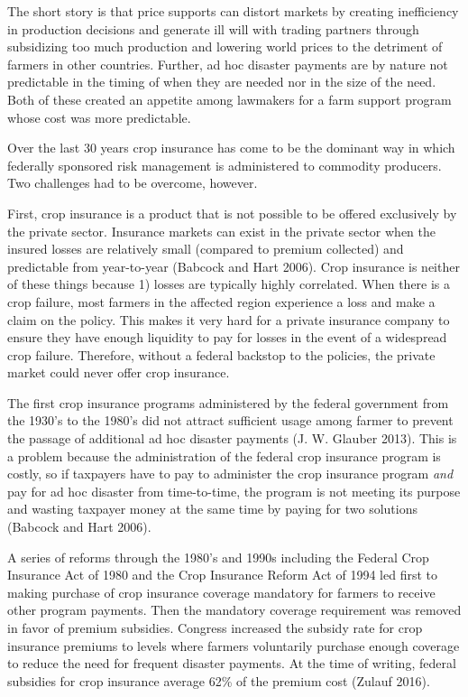 \documentclass[
  letterpaper,
  DIV=11,
  numbers=noendperiod]{scrreprt}
\begin{document}
The short story is that price supports can distort markets by creating
inefficiency in production decisions and generate ill will with trading
partners through subsidizing too much production and lowering world
prices to the detriment of farmers in other countries. Further, ad hoc
disaster payments are by nature not predictable in the timing of when
they are needed nor in the size of the need. Both of these created an
appetite among lawmakers for a farm support program whose cost was more
predictable.

Over the last 30 years crop insurance has come to be the dominant way in
which federally sponsored risk management is administered to commodity
producers. Two challenges had to be overcome, however.

First, crop insurance is a product that is not possible to be offered
exclusively by the private sector. Insurance markets can exist in the
private sector when the insured losses are relatively small (compared to
premium collected) and predictable from year-to-year (Babcock and Hart
2006). Crop insurance is neither of these things because 1) losses are
typically highly correlated. When there is a crop failure, most farmers
in the affected region experience a loss and make a claim on the policy.
This makes it very hard for a private insurance company to ensure they
have enough liquidity to pay for losses in the event of a widespread
crop failure. Therefore, without a federal backstop to the policies, the
private market could never offer crop insurance.

The first crop insurance programs administered by the federal government
from the 1930's to the 1980's did not attract sufficient usage among
farmer to prevent the passage of additional ad hoc disaster payments (J.
W. Glauber 2013). This is a problem because the administration of the
federal crop insurance program is costly, so if taxpayers have to pay to
administer the crop insurance program \emph{and} pay for ad hoc disaster
from time-to-time, the program is not meeting its purpose and wasting
taxpayer money at the same time by paying for two solutions (Babcock and
Hart 2006).

A series of reforms through the 1980's and 1990s including the Federal
Crop Insurance Act of 1980 and the Crop Insurance Reform Act of 1994 led
first to making purchase of crop insurance coverage mandatory for
farmers to receive other program payments. Then the mandatory coverage
requirement was removed in favor of premium subsidies. Congress
increased the subsidy rate for crop insurance premiums to levels where
farmers voluntarily purchase enough coverage to reduce the need for
frequent disaster payments. At the time of writing, federal subsidies
for crop insurance average 62\% of the premium cost (Zulauf 2016).
\end{document}

